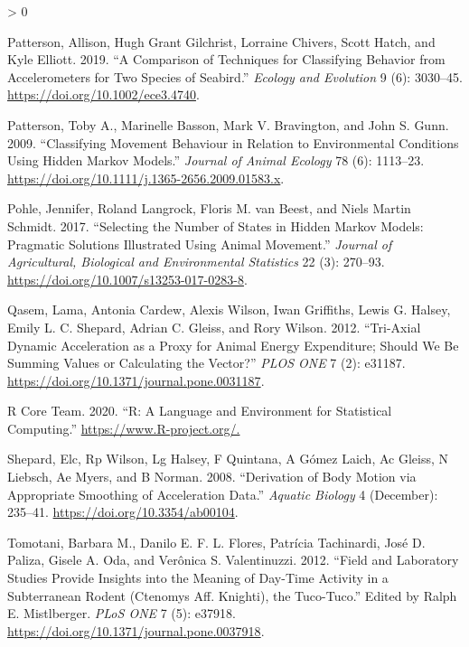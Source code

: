 \documentclass[english,msc,numbers,hidelinks]{coppe}
\newlength{\cslhangindent}
\newenvironment{CSLReferences}[2] %
 {%
  \setlength{\parindent}{0pt}
  \ifodd #1 \everypar{\setlength{\hangindent}{\cslhangindent}}\ignorespaces\fi
  \ifnum #2 > 0
  \setlength{\parskip}{#2\baselineskip}
  \fi
 }%
 {}
\begin{document}
\begin{CSLReferences}{1}{0}
  \leavevmode\hypertarget{ref-patterson2019}{}%
  Patterson, Allison, Hugh Grant Gilchrist, Lorraine Chivers, Scott Hatch, and Kyle Elliott. 2019. {``A Comparison of Techniques for Classifying Behavior from Accelerometers for Two Species of Seabird.''} \emph{Ecology and Evolution} 9 (6): 3030--45. \url{https://doi.org/10.1002/ece3.4740}.

  \leavevmode\hypertarget{ref-patterson2009}{}%
  Patterson, Toby A., Marinelle Basson, Mark V. Bravington, and John S. Gunn. 2009. {``Classifying Movement Behaviour in Relation to Environmental Conditions Using Hidden Markov Models.''} \emph{Journal of Animal Ecology} 78 (6): 1113--23. \url{https://doi.org/10.1111/j.1365-2656.2009.01583.x}.

  \leavevmode\hypertarget{ref-pohle2017}{}%
  Pohle, Jennifer, Roland Langrock, Floris M. van Beest, and Niels Martin Schmidt. 2017. {``Selecting the Number of States in Hidden Markov Models: Pragmatic Solutions Illustrated Using Animal Movement.''} \emph{Journal of Agricultural, Biological and Environmental Statistics} 22 (3): 270--93. \url{https://doi.org/10.1007/s13253-017-0283-8}.

  \leavevmode\hypertarget{ref-qasem2012}{}%
  Qasem, Lama, Antonia Cardew, Alexis Wilson, Iwan Griffiths, Lewis G. Halsey, Emily L. C. Shepard, Adrian C. Gleiss, and Rory Wilson. 2012. {``Tri-Axial Dynamic Acceleration as a Proxy for Animal Energy Expenditure; Should We Be Summing Values or Calculating the Vector?''} \emph{PLOS ONE} 7 (2): e31187. \url{https://doi.org/10.1371/journal.pone.0031187}.

  \leavevmode\hypertarget{ref-rcoreteam2020}{}%
  R Core Team. 2020. {``R: A Language and Environment for Statistical Computing.''} \url{https://www.R-project.org/.}

  \leavevmode\hypertarget{ref-shepard2008}{}%
  Shepard, Elc, Rp Wilson, Lg Halsey, F Quintana, A Gómez Laich, Ac Gleiss, N Liebsch, Ae Myers, and B Norman. 2008. {``Derivation of Body Motion via Appropriate Smoothing of Acceleration Data.''} \emph{Aquatic Biology} 4 (December): 235--41. \url{https://doi.org/10.3354/ab00104}.

  \leavevmode\hypertarget{ref-tomotani2012}{}%
  Tomotani, Barbara M., Danilo E. F. L. Flores, Patrícia Tachinardi, José D. Paliza, Gisele A. Oda, and Verônica S. Valentinuzzi. 2012. {``Field and Laboratory Studies Provide Insights into the Meaning of Day-Time Activity in a Subterranean Rodent (Ctenomys Aff. Knighti), the Tuco-Tuco.''} Edited by Ralph E. Mistlberger. \emph{PLoS ONE} 7 (5): e37918. \url{https://doi.org/10.1371/journal.pone.0037918}.


\end{CSLReferences}
\end{document}
